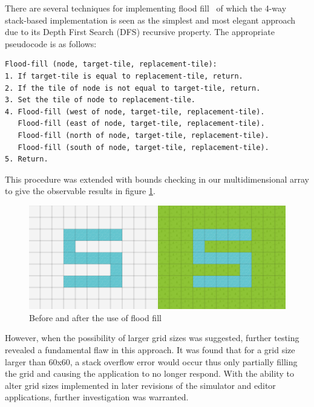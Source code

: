 There are several techniques for implementing flood fill~\cite{lodev2015} of which the 4-way stack-based implementation is seen as the simplest and most elegant approach due to its Depth First Search (DFS) recursive property. The appropriate pseudocode is as follows:

\begin{minipage}{0.9\textwidth}
	\begin{lstlisting}[caption={4-way stack-based recursive flood fill~\cite{codecodex2015}}, label={lst:stackFloodFill}]
Flood-fill (node, target-tile, replacement-tile):
1. If target-tile is equal to replacement-tile, return.
2. If the tile of node is not equal to target-tile, return.
3. Set the tile of node to replacement-tile.
4. Flood-fill (west of node, target-tile, replacement-tile).
   Flood-fill (east of node, target-tile, replacement-tile).
   Flood-fill (north of node, target-tile, replacement-tile).
   Flood-fill (south of node, target-tile, replacement-tile).
5. Return.
	\end{lstlisting}
\end{minipage}

This procedure was extended with bounds checking in our multidimensional array to give the observable results in figure \ref{fig:floodfill}.

\begin{figure}[b]
	\begin{center}
		\includegraphics[scale=0.8]{img/floodFill.png}
		\caption[Flood Fill]{Before and after the use of flood fill}
	\label{fig:floodfill}
	\end{center}
\end{figure}

However, when the possibility of larger grid sizes was suggested, further testing revealed a fundamental flaw in this approach.  It was found that for a grid size larger than 60x60, a stack overflow error would occur thus only partially filling the grid and causing the application to no longer respond.  With the ability to alter grid sizes implemented in later revisions of the simulator and editor applications, further investigation was warranted.

